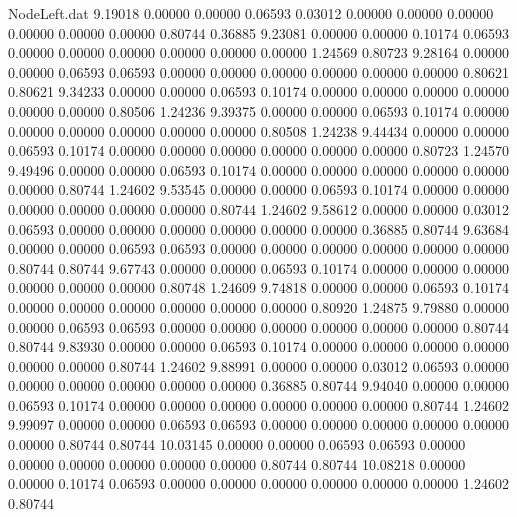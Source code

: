 \begin{filecontents}{NodeLeft.dat}
   9.19018    0.00000    0.00000     0.06593    0.03012    0.00000    0.00000    0.00000    0.00000    0.00000    0.00000    0.80744    0.36885
   9.23081    0.00000    0.00000     0.10174    0.06593    0.00000    0.00000    0.00000    0.00000    0.00000    0.00000    1.24569    0.80723
   9.28164    0.00000    0.00000     0.06593    0.06593    0.00000    0.00000    0.00000    0.00000    0.00000    0.00000    0.80621    0.80621
   9.34233    0.00000    0.00000     0.06593    0.10174    0.00000    0.00000    0.00000    0.00000    0.00000    0.00000    0.80506    1.24236
   9.39375    0.00000    0.00000     0.06593    0.10174    0.00000    0.00000    0.00000    0.00000    0.00000    0.00000    0.80508    1.24238
   9.44434    0.00000    0.00000     0.06593    0.10174    0.00000    0.00000    0.00000    0.00000    0.00000    0.00000    0.80723    1.24570
   9.49496    0.00000    0.00000     0.06593    0.10174    0.00000    0.00000    0.00000    0.00000    0.00000    0.00000    0.80744    1.24602
   9.53545    0.00000    0.00000     0.06593    0.10174    0.00000    0.00000    0.00000    0.00000    0.00000    0.00000    0.80744    1.24602
   9.58612    0.00000    0.00000     0.03012    0.06593    0.00000    0.00000    0.00000    0.00000    0.00000    0.00000    0.36885    0.80744
   9.63684    0.00000    0.00000     0.06593    0.06593    0.00000    0.00000    0.00000    0.00000    0.00000    0.00000    0.80744    0.80744
   9.67743    0.00000    0.00000     0.06593    0.10174    0.00000    0.00000    0.00000    0.00000    0.00000    0.00000    0.80748    1.24609
   9.74818    0.00000    0.00000     0.06593    0.10174    0.00000    0.00000    0.00000    0.00000    0.00000    0.00000    0.80920    1.24875
   9.79880    0.00000    0.00000     0.06593    0.06593    0.00000    0.00000    0.00000    0.00000    0.00000    0.00000    0.80744    0.80744
   9.83930    0.00000    0.00000     0.06593    0.10174    0.00000    0.00000    0.00000    0.00000    0.00000    0.00000    0.80744    1.24602
   9.88991    0.00000    0.00000     0.03012    0.06593    0.00000    0.00000    0.00000    0.00000    0.00000    0.00000    0.36885    0.80744
   9.94040    0.00000    0.00000     0.06593    0.10174    0.00000    0.00000    0.00000    0.00000    0.00000    0.00000    0.80744    1.24602
   9.99097    0.00000    0.00000     0.06593    0.06593    0.00000    0.00000    0.00000    0.00000    0.00000    0.00000    0.80744    0.80744
  10.03145    0.00000    0.00000     0.06593    0.06593    0.00000    0.00000    0.00000    0.00000    0.00000    0.00000    0.80744    0.80744
  10.08218    0.00000    0.00000     0.10174    0.06593    0.00000    0.00000    0.00000    0.00000    0.00000    0.00000    1.24602    0.80744

\end{filecontents}
